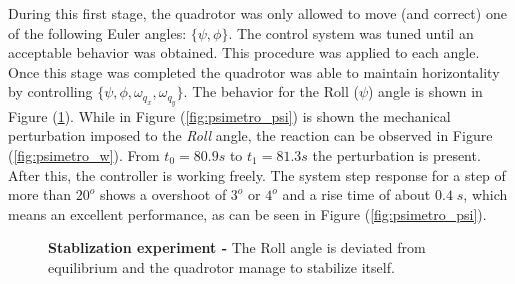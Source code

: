 \documentclass[conference]{IEEEtran}
\newcommand{\refp}[1]{(\ref{#1})}
\begin{document}
During this first stage, the quadrotor was only allowed to move (and correct) one of the following Euler angles: $\{\psi,\phi\}$. The control system was tuned until an acceptable behavior was obtained. This procedure was applied to each angle. Once this stage was completed the quadrotor was able to maintain horizontality by controlling $\{\psi,\phi,\omega_{q_x},\omega_{q_y}\}$. The behavior for the Roll ($\psi$) angle is shown in Figure \refp{fig:psimetro}. While in Figure \refp{fig:psimetro_psi} is shown the mechanical perturbation imposed to the \emph{Roll} angle, the reaction can be observed in Figure \refp{fig:psimetro_w}. From $t_0 = 80.9 s$ to $t_1 =81.3 s$ the perturbation is present. After this, the controller is working freely. The system step response for a step of more than $20^o$ shows a overshoot of $3^o$ or $4^o$ and a rise time of about $0.4\;s$, which means an excellent performance, as can be seen in Figure \refp{fig:psimetro_psi}.
\begin{figure}[h!]
  \centering
   \hspace*{-5pt}
  \caption{\textbf{Stablization experiment -} The Roll angle is deviated from equilibrium and the quadrotor manage to stabilize itself.}
  \label{fig:psimetro}
\end{figure}
\end{document}
